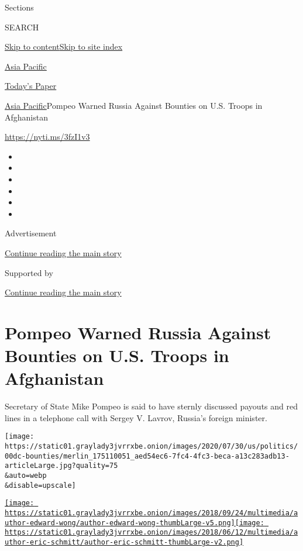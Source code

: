 Sections

SEARCH

\protect\hyperlink{site-content}{Skip to
content}\protect\hyperlink{site-index}{Skip to site index}

\href{https://www.nytimes3xbfgragh.onion/section/world/asia}{Asia
Pacific}

\href{https://myaccount.nytimes3xbfgragh.onion/auth/login?response_type=cookie\&client_id=vi}{}

\href{https://www.nytimes3xbfgragh.onion/section/todayspaper}{Today's
Paper}

\href{/section/world/asia}{Asia Pacific}\textbar{}Pompeo Warned Russia
Against Bounties on U.S. Troops in Afghanistan

\href{https://nyti.ms/3fzI1v3}{https://nyti.ms/3fzI1v3}

\begin{itemize}
\item
\item
\item
\item
\item
\item
\end{itemize}

Advertisement

\protect\hyperlink{after-top}{Continue reading the main story}

Supported by

\protect\hyperlink{after-sponsor}{Continue reading the main story}

\hypertarget{pompeo-warned-russia-against-bounties-on-us-troops-in-afghanistan}{%
\section{Pompeo Warned Russia Against Bounties on U.S. Troops in
Afghanistan}\label{pompeo-warned-russia-against-bounties-on-us-troops-in-afghanistan}}

Secretary of State Mike Pompeo is said to have sternly discussed payouts
and red lines in a telephone call with Sergey V. Lavrov, Russia's
foreign minister.

\texttt{[image: https://static01.graylady3jvrrxbe.onion/images/2020/07/30/us/politics/00dc-bounties/merlin\_175110051\_aed54ec6-7fc4-4fc3-beca-a13c283adb13-articleLarge.jpg?quality=75\\\&auto=webp\\\&disable=upscale]}

\href{https://www.nytimes3xbfgragh.onion/by/edward-wong}{\texttt{[image: https://static01.graylady3jvrrxbe.onion/images/2018/09/24/multimedia/author-edward-wong/author-edward-wong-thumbLarge-v5.png]}}\href{https://www.nytimes3xbfgragh.onion/by/eric-schmitt}{\texttt{[image: https://static01.graylady3jvrrxbe.onion/images/2018/06/12/multimedia/author-eric-schmitt/author-eric-schmitt-thumbLarge-v2.png]}}

